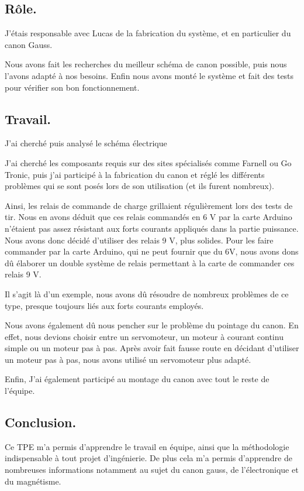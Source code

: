 \subsection{Rôle.}

J’étais responsable avec Lucas de la fabrication du système, et en particulier du canon Gauss.

Nous avons fait les recherches du meilleur schéma de canon possible, puis nous l’avons adapté à nos besoins. Enfin nous avons monté le système et fait des tests pour vérifier son bon fonctionnement.

\subsection{Travail.}

J’ai cherché puis analysé le schéma électrique 

J’ai cherché les composants requis sur des sites spécialisés comme Farnell ou Go Tronic, puis j’ai participé à la fabrication du canon et réglé les différents problèmes qui se sont posés lors de son utilisation (et ils furent nombreux).

Ainsi, les relais de commande de charge grillaient régulièrement lors des tests de tir. Nous en avons déduit que ces relais commandés en 6 V par la carte Arduino n’étaient pas assez résistant aux forts courants appliqués dans la partie puissance. Nous avons donc décidé d’utiliser des relais 9 V, plus solides. Pour les faire commander par la carte Arduino, qui ne peut fournir que du 6V, nous avons dons dû élaborer un double système de relais permettant à la carte de commander ces relais 9 V.

Il s’agit là d’un exemple, nous avons dû résoudre de nombreux problèmes de ce type, presque toujours liés aux forts courants employés.

Nous avons également dû nous pencher sur le problème du pointage du canon. En effet, nous devions choisir entre un servomoteur, un moteur à courant continu simple ou un moteur pas à pas. Après avoir fait fausse route en décidant d’utiliser un moteur pas à pas, nous avons utilisé un servomoteur plus adapté.

Enfin, J’ai également participé au montage du canon avec tout le reste de l’équipe.


\subsection{Conclusion.}

Ce TPE m’a permis d’apprendre le travail en équipe, ainsi que la méthodologie indispensable à tout projet d’ingénierie. De plus cela m’a permis d’apprendre de nombreuses informations notamment au sujet du canon gauss,  de l’électronique et du magnétisme.











